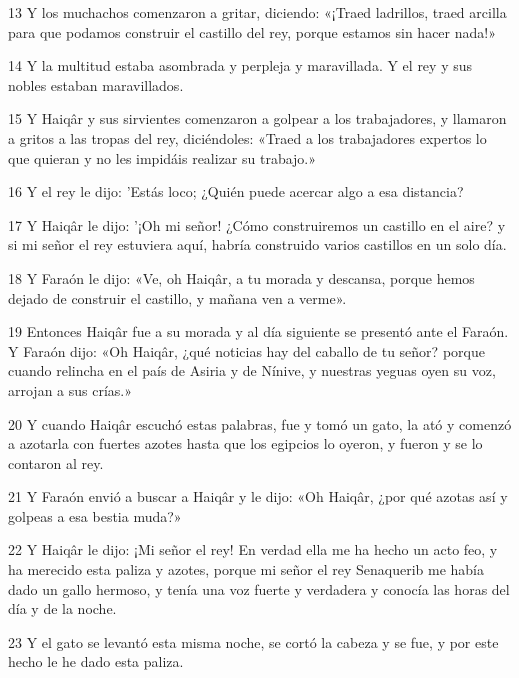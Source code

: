 \par 13 Y los muchachos comenzaron a gritar, diciendo: «¡Traed ladrillos, traed arcilla para que podamos construir el castillo del rey, porque estamos sin hacer nada!»

\par 14 Y la multitud estaba asombrada y perpleja y maravillada. Y el rey y sus nobles estaban maravillados.

\par 15 Y Haiqâr y sus sirvientes comenzaron a golpear a los trabajadores, y llamaron a gritos a las tropas del rey, diciéndoles: «Traed a los trabajadores expertos lo que quieran y no les impidáis realizar su trabajo.»

\par 16 Y el rey le dijo: 'Estás loco; ¿Quién puede acercar algo a esa distancia?

\par 17 Y Haiqâr le dijo: '¡Oh mi señor! ¿Cómo construiremos un castillo en el aire? y si mi señor el rey estuviera aquí, habría construido varios castillos en un solo día.

\par 18 Y Faraón le dijo: «Ve, oh Haiqâr, a tu morada y descansa, porque hemos dejado de construir el castillo, y mañana ven a verme».

\par 19 Entonces Haiqâr fue a su morada y al día siguiente se presentó ante el Faraón. Y Faraón dijo: «Oh Haiqâr, ¿qué noticias hay del caballo de tu señor? porque cuando relincha en el país de Asiria y de Nínive, y nuestras yeguas oyen su voz, arrojan a sus crías.»

\par 20 Y cuando Haiqâr escuchó estas palabras, fue y tomó un gato, la ató y comenzó a azotarla con fuertes azotes hasta que los egipcios lo oyeron, y fueron y se lo contaron al rey.

\par 21 Y Faraón envió a buscar a Haiqâr y le dijo: «Oh Haiqâr, ¿por qué azotas así y golpeas a esa bestia muda?»

\par 22 Y Haiqâr le dijo: ¡Mi señor el rey! En verdad ella me ha hecho un acto feo, y ha merecido esta paliza y azotes, porque mi señor el rey Senaquerib me había dado un gallo hermoso, y tenía una voz fuerte y verdadera y conocía las horas del día y de la noche.

\par 23 Y el gato se levantó esta misma noche, se cortó la cabeza y se fue, y por este hecho le he dado esta paliza.

